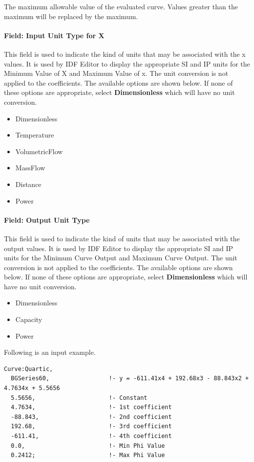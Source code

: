 The maximum allowable value of the evaluated curve. Values greater than the maximum will be replaced by the maximum.

\paragraph{Field: Input Unit Type for X}\label{field-input-unit-type-for-x-4}

This field is used to indicate the kind of units that may be associated with the x values. It is used by IDF Editor to display the appropriate SI and IP units for the Minimum Value of X and Maximum Value of x. The unit conversion is not applied to the coefficients. The available options are shown below. If none of these options are appropriate, select \textbf{Dimensionless} which will have no unit conversion.

\begin{itemize}
\item
  Dimensionless
\item
  Temperature
\item
  VolumetricFlow
\item
  MassFlow
\item
  Distance
\item
  Power
\end{itemize}

\paragraph{Field: Output Unit Type}\label{field-output-unit-type-3}

This field is used to indicate the kind of units that may be associated with the output values. It is used by IDF Editor to display the appropriate SI and IP units for the Minimum Curve Output and Maximum Curve Output. The unit conversion is not applied to the coefficients. The available options are shown below. If none of these options are appropriate, select \textbf{Dimensionless} which will have no unit conversion.

\begin{itemize}
\item
  Dimensionless
\item
  Capacity
\item
  Power
\end{itemize}

Following is an input example.

\begin{lstlisting}
Curve:Quartic,
  BGSeries60,                 !- y = -611.41x4 + 192.68x3 - 88.843x2 + 4.7634x + 5.5656
  5.5656,                     !- Constant
  4.7634,                     !- 1st coefficient
  -88.843,                    !- 2nd coefficient
  192.68,                     !- 3rd coefficient
  -611.41,                    !- 4th coefficient
  0.0,                        !- Min Phi Value
  0.2412;                     !- Max Phi Value
\end{lstlisting}

